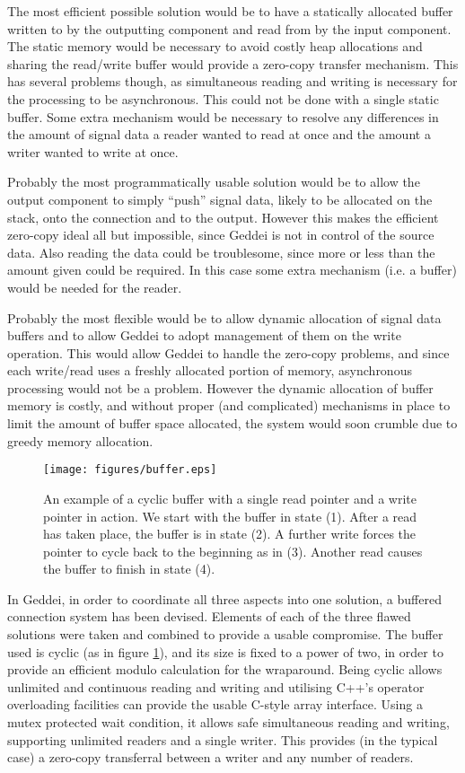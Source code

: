 The most efficient possible solution would be to have a statically allocated buffer written to by the outputting component and read from by the input component. The static memory would be necessary to avoid costly heap allocations and sharing the read/write buffer would provide a zero-copy transfer mechanism. This has several problems though, as simultaneous reading and writing is necessary for the processing to be asynchronous. This could not be done with a single static buffer. Some extra mechanism would be necessary to resolve any differences in the amount of signal data a reader wanted to read at once and the amount a writer wanted to write at once.

Probably the most programmatically usable solution would be to allow the output component to simply ``push'' signal data, likely to be allocated on the stack, onto the connection and to the output. However this makes the efficient zero-copy ideal all but impossible, since Geddei is not in control of the source data. Also reading the data could be troublesome, since more or less than the amount given could be required. In this case some extra mechanism (i.e. a buffer) would be needed for the reader.

Probably the most flexible would be to allow dynamic allocation of signal data buffers and to allow Geddei to adopt management of them on the write operation. This would allow Geddei to handle the zero-copy problems, and since each write/read uses a freshly allocated portion of memory, asynchronous processing would not be a problem. However the dynamic allocation of buffer memory is costly, and without proper (and complicated) mechanisms in place to limit the amount of buffer space allocated, the system would soon crumble due to greedy memory allocation.

\begin{figure}[ht!]
\centering
\texttt{[image: figures/buffer.eps]}
\caption{An example of a cyclic buffer with a single read pointer and a write pointer in action. We start with the buffer in state (1). After a read has taken place, the buffer is in state (2). A further write forces the pointer to cycle back to the beginning as in (3). Another read causes the buffer to finish in state (4).}
\label{fig:buffer}
\end{figure}

In Geddei, in order to coordinate all three aspects into one solution, a buffered connection system has been devised. Elements of each of the three flawed solutions were taken and combined to provide a usable compromise. The buffer used is cyclic (as in figure \ref{fig:buffer}), and its size is fixed to a power of two, in order to provide an efficient modulo calculation for the wraparound. Being cyclic allows unlimited and continuous reading and writing and utilising C++'s operator overloading facilities can provide the usable C-style array interface. Using a mutex protected wait condition, it allows safe simultaneous reading and writing, supporting unlimited readers and a single writer. This provides (in the typical case) a zero-copy transferral between a writer and any number of readers.

